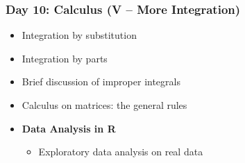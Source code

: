 \documentclass[12pt]{article}
\begin{document}
\subsubsection*{Day 10: Calculus (V -- More Integration)}

\begin{itemize} \itemsep-0.35em
\item Integration by substitution
\item Integration by parts
\item Brief discussion of improper integrals
\item Calculus on matrices: the general rules%
\item \textbf{Data Analysis in R}
\begin{itemize}
  \item Exploratory data analysis on real data
\end{itemize}
\end{itemize}


\end{document}
